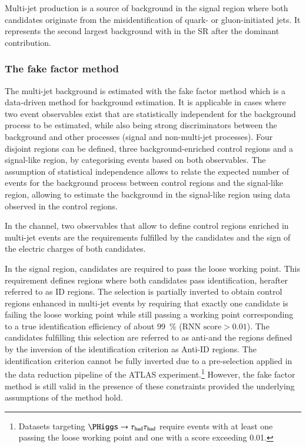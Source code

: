 \label{sec:hadhad_multijet}


Multi-jet production is a source of background in the \hadhad signal
region where both \tauhadvis candidates originate from the
misidentification of quark- or gluon-initiated jets. It represents the
second largest background with \faketauhadvis in the \hadhad SR after
the dominant \ttbarFakes contribution.

\subsubsection{The fake factor method}

The multi-jet background is estimated with the fake factor method
which is a data-driven method for background estimation. It is
applicable in cases where two event observables exist that are
statistically independent for the background process to be estimated,
while also being strong discriminators between the background and
other processes (signal and non-multi-jet processes). Four disjoint
regions can be defined, three background-enriched control regions and
a signal-like region, by categorising events based on both
observables. The assumption of statistical independence allows to
relate the expected number of events for the background process
between control regions and the signal-like region, allowing to
estimate the background in the signal-like region using data observed
in the control regions.

In the \hadhad channel, two observables that allow to define control
regions enriched in multi-jet events are the \tauid requirements
fulfilled by the \tauhadvis candidates and the sign of the electric
charges of both candidates.

In the signal region, \tauhadvis candidates are required to pass the
loose \tauid working point. This requirement defines regions where
both \tauhadvis candidates pass identification, herafter referred to
as ID regions. The selection is partially inverted to obtain control
regions enhanced in multi-jet events by requiring that exactly one
\tauhadvis candidate is failing the loose \tauid working point while
still passing a working point corresponding to a true \tauhadvis
identification efficiency of about \SI{99}{\percent}
($\text{RNN score} > 0.01$). The \tauhadvis candidates fulfilling this
selection are referred to as anti-\tauhadvis and the regions defined
by the inversion of the identification criterion as Anti-ID
regions. The identification criterion cannot be fully inverted due to
a pre-selection applied in the data reduction pipeline of the ATLAS
experiment.\footnote{Datasets targeting $\PHiggs \to \hadhad$ require
  events with at least one \tauhadvis passing the loose \tauid working
  point and one \tauhadvis with a \tauid score exceeding 0.01.}
However, the fake factor method is still valid in the presence of
these constraints provided the underlying assumptions of the method
hold.

